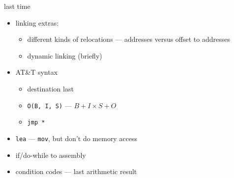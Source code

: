 \begin{frame}{last time}
\begin{itemize}
\item linking extras:
    \begin{itemize}
    \item different kinds of relocations --- addresses versus offset to addresses
    \item dynamic linking (briefly)
    \end{itemize}
\item AT\&T syntax 
\begin{itemize}
\item destination last
\item {\tt O(B, I, S)} --- $B + I \times S + O$
\item {\tt jmp *}
\end{itemize}
\item {\tt lea} --- {\tt mov}, but don't do memory access
\item if/do-while to assembly
\item condition codes --- last arithmetic result
\end{itemize}
\end{frame}
